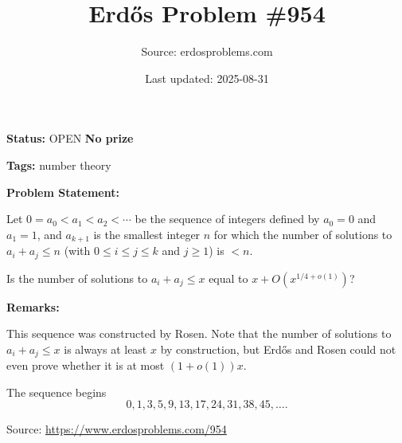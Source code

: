 \documentclass{article}
\title{Erd\H{o}s Problem \#954}
\date{Last updated: 2025-08-31}
\author{Source: erdosproblems.com}
\begin{document}
\maketitle

\noindent\textbf{Status:} OPEN \quad \textbf{No prize}

\noindent\textbf{Tags:} number theory

\medskip
\noindent\textbf{Problem Statement:}

Let $0=a_0<a_1<a_2<\cdots$ be the sequence of integers defined by $a_0=0$ and $a_1=1$, and $a_{k+1}$ is the smallest integer $n$ for which the number of solutions to $a_i+a_j \leq n$ (with $0\leq i\leq j\leq k$ and $j\geq 1$) is $<n$.

Is the number of solutions to $a_i+a_j \leq x$ equal to $x+O(x^{1/4+o(1)})$?

\bigskip
\noindent\textbf{Remarks:}

This sequence was constructed by Rosen. Note that the number of solutions to $a_i+a_j\leq x$ is always at least $x$ by construction, but Erd\H{o}s and Rosen could not even prove whether it is at most $(1+o(1))x$.

The sequence begins\[0,1,3,5,9,13,17,24,31,38,45,\ldots.\]

\bigskip
\noindent\small{Source: \url{https://www.erdosproblems.com/954}}
\end{document}
